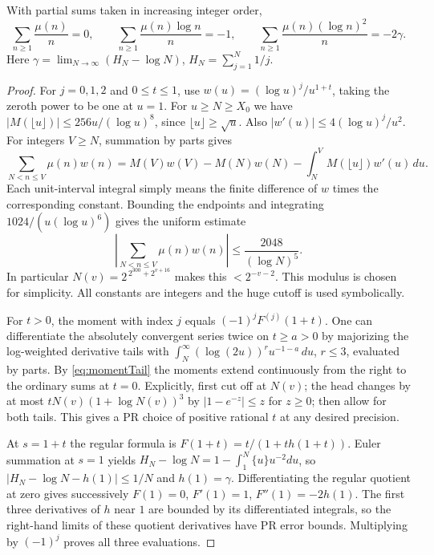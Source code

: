 \begin{theorem}
With partial sums taken in increasing integer order,
\[
 \sum_{n\ge1}\frac{\mu(n)}n=0,\qquad
 \sum_{n\ge1}\frac{\mu(n)\log n}n=-1,\qquad
 \sum_{n\ge1}\frac{\mu(n)(\log n)^2}n=-2\gamma.
\]
Here $\gamma=\lim_{N\to\infty}(H_N-\log N)$, $H_N=\sum_{j=1}^N 1/j$.
\end{theorem}
\begin{proof}
For $j=0,1,2$ and $0\le t\le1$, use $w(u)=(\log u)^j/u^{1+t}$,
taking the zeroth power to be one at $u=1$.
For $u\ge N\ge X_0$ we have
$|M(\lfloor u\rfloor)|\le256u/(\log u)^8$, since
$\lfloor u\rfloor\ge\sqrt u$.
Also $|w'(u)|\le4(\log u)^j/u^2$.
For integers $V\ge N$, summation by parts gives
\[
 \sum_{N<n\le V}\mu(n)w(n)=M(V)w(V)-M(N)w(N)
                    -\int_N^V M(\lfloor u\rfloor)w'(u)\,du .
\]
Each unit-interval integral simply means the finite difference of $w$
times the corresponding constant. Bounding the endpoints and integrating
$1024/(u(\log u)^6)$ gives the uniform estimate
\begin{equation}\label{eq:momentTail}
 \left|\sum_{N<n\le V}\mu(n)w(n)\right|\le
                       \frac{2048}{(\log N)^5}.
\end{equation}
In particular $N(v)=2^{\,2^{300}+2^{v+16}}$ makes this $<2^{-v-2}$.
This modulus is chosen for simplicity. All constants are integers and
the huge cutoff is used symbolically.

For $t>0$, the moment with index $j$ equals $(-1)^j F^{(j)}(1+t)$.
One can differentiate the absolutely convergent series twice on
$t\ge a>0$ by majorizing the log-weighted derivative tails with
$\int_N^\infty(\log(2u))^r u^{-1-a}\,du$, $r\le3$, evaluated by parts.
By \eqref{eq:momentTail} the moments extend continuously from the
right to the ordinary sums at $t=0$. Explicitly, first cut off at $N(v)$;
the head changes by at most $tN(v)(1+\log N(v))^3$ by
$|1-e^{-z}|\le z$ for $z\ge0$; then allow for both tails. This gives
a PR choice of positive rational $t$ at any desired precision.

At $s=1+t$ the regular formula is $F(1+t)=t/(1+t h(1+t))$.
Euler summation at $s=1$ yields
$H_N-\log N=1-\int_1^N\{u\}u^{-2}du$, so
$|H_N-\log N-h(1)|\le1/N$ and $h(1)=\gamma$.
Differentiating the regular quotient at zero gives successively
$F(1)=0$, $F'(1)=1$, $F''(1)=-2h(1)$. The first three derivatives
of $h$ near $1$ are bounded by its differentiated integrals, so the
right-hand limits of these quotient derivatives have PR error bounds.
Multiplying by $(-1)^j$ proves all three evaluations.
\end{proof}

